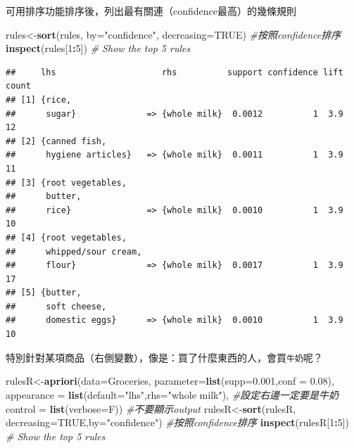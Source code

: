 \documentclass[]{book}
\newenvironment{Shaded}{\begin{snugshade}}{\end{snugshade}}
\newcommand{\CommentTok}[1]{\textcolor[rgb]{0.56,0.35,0.01}{\textit{#1}}}
\newcommand{\DataTypeTok}[1]{\textcolor[rgb]{0.13,0.29,0.53}{#1}}
\newcommand{\DecValTok}[1]{\textcolor[rgb]{0.00,0.00,0.81}{#1}}
\newcommand{\FloatTok}[1]{\textcolor[rgb]{0.00,0.00,0.81}{#1}}
\newcommand{\KeywordTok}[1]{\textcolor[rgb]{0.13,0.29,0.53}{\textbf{#1}}}
\newcommand{\NormalTok}[1]{#1}
\newcommand{\OperatorTok}[1]{\textcolor[rgb]{0.81,0.36,0.00}{\textbf{#1}}}
\newcommand{\OtherTok}[1]{\textcolor[rgb]{0.56,0.35,0.01}{#1}}
\newcommand{\StringTok}[1]{\textcolor[rgb]{0.31,0.60,0.02}{#1}}
\begin{document}
可用排序功能排序後，列出最有關連（confidence最高）的幾條規則

\begin{Shaded}
\begin{Highlighting}[]
\NormalTok{rules<-}\KeywordTok{sort}\NormalTok{(rules, }\DataTypeTok{by=}\StringTok{"confidence"}\NormalTok{, }\DataTypeTok{decreasing=}\OtherTok{TRUE}\NormalTok{) }\CommentTok{#按照confidence排序}
\KeywordTok{inspect}\NormalTok{(rules[}\DecValTok{1}\OperatorTok{:}\DecValTok{5}\NormalTok{]) }\CommentTok{# Show the top 5 rules}
\end{Highlighting}
\end{Shaded}

\begin{verbatim}
##     lhs                     rhs          support confidence lift count
## [1] {rice,                                                            
##      sugar}              => {whole milk}  0.0012          1  3.9    12
## [2] {canned fish,                                                     
##      hygiene articles}   => {whole milk}  0.0011          1  3.9    11
## [3] {root vegetables,                                                 
##      butter,                                                          
##      rice}               => {whole milk}  0.0010          1  3.9    10
## [4] {root vegetables,                                                 
##      whipped/sour cream,                                              
##      flour}              => {whole milk}  0.0017          1  3.9    17
## [5] {butter,                                                          
##      soft cheese,                                                     
##      domestic eggs}      => {whole milk}  0.0010          1  3.9    10
\end{verbatim}

特別針對某項商品（右側變數），像是：買了什麼東西的人，會買\texttt{牛奶}呢？

\begin{Shaded}
\begin{Highlighting}[]
\NormalTok{rulesR<-}\KeywordTok{apriori}\NormalTok{(}\DataTypeTok{data=}\NormalTok{Groceries, }\DataTypeTok{parameter=}\KeywordTok{list}\NormalTok{(}\DataTypeTok{supp=}\FloatTok{0.001}\NormalTok{,}\DataTypeTok{conf =} \FloatTok{0.08}\NormalTok{),}
        \DataTypeTok{appearance =} \KeywordTok{list}\NormalTok{(}\DataTypeTok{default=}\StringTok{"lhs"}\NormalTok{,}\DataTypeTok{rhs=}\StringTok{"whole milk"}\NormalTok{), }\CommentTok{#設定右邊一定要是牛奶}
        \DataTypeTok{control =} \KeywordTok{list}\NormalTok{(}\DataTypeTok{verbose=}\NormalTok{F)) }\CommentTok{#不要顯示output}
\NormalTok{rulesR<-}\KeywordTok{sort}\NormalTok{(rulesR, }\DataTypeTok{decreasing=}\OtherTok{TRUE}\NormalTok{,}\DataTypeTok{by=}\StringTok{"confidence"}\NormalTok{) }\CommentTok{#按照confidence排序}
\KeywordTok{inspect}\NormalTok{(rulesR[}\DecValTok{1}\OperatorTok{:}\DecValTok{5}\NormalTok{]) }\CommentTok{# Show the top 5 rules}
\end{Highlighting}
\end{Shaded}
\end{document}
